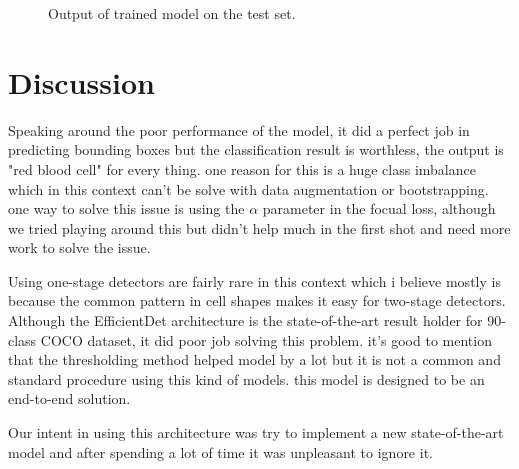 \documentclass[11pt]{article}
\begin{document}
\begin{figure}[!ht]
	\centering
	\caption{Output of trained model on the test set.}
	\qquad
	\qquad
	\label{fig:out}
\end{figure}

\section{Discussion}

Speaking around the poor performance of the model, it did a perfect job in predicting bounding boxes but the classification result is worthless, the output is "red blood cell" for every thing. one reason for this is a huge class imbalance which in this context can't be solve with data augmentation or bootstrapping. one way to solve this issue is using the $\alpha$ parameter in the focual loss, although we tried playing around this but didn't help much in the first shot and need more work to solve the issue.

Using one-stage detectors are fairly rare in this context which i believe mostly is because the common pattern in cell shapes makes it easy for two-stage detectors. Although the EfficientDet architecture is the state-of-the-art result holder for 90-class COCO dataset, it did poor job solving this problem. it's good to mention that the thresholding method helped model by a lot but it is not a common and standard procedure using this kind of models. this model is designed to be an end-to-end solution.

Our intent in using this architecture was try to implement a new state-of-the-art model and after spending a lot of time it was unpleasant to ignore it.

\nocite{*}

\printbibliography[title={Reference}]
\end{document}
